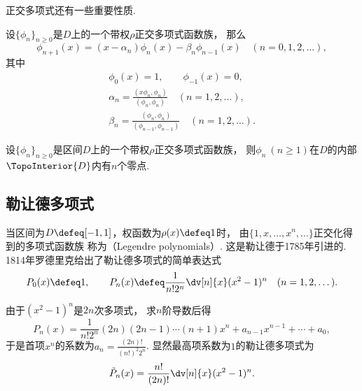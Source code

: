 正交多项式还有一些重要性质.
\begin{theorem}
设\(\{\phi_n\}_{n\geq0}\)是\(D\)上的一个带权\(\rho\)正交多项式函数族，
那么\begin{equation}
	\phi_{n+1}(x)
	= (x - \alpha_n) \phi_n(x)
	- \beta_n \phi_{n-1}(x)
	\quad(n=0,1,2,\dotsc),
\end{equation}
其中\begin{gather*}
	\phi_0(x) = 1,
	\qquad
	\phi_{-1}(x) = 0, \\
	\alpha_n
	= \frac{(x \phi_n,\phi_n)}{(\phi_n,\phi_n)}
	\quad(n=1,2,\dotsc), \\
	\beta_n
	= \frac{(\phi_n,\phi_n)}{(\phi_{n-1},\phi_{n-1})}
	\quad(n=1,2,\dotsc).
\end{gather*}
\end{theorem}

\begin{theorem}
设\(\{\phi_n\}_{n\geq0}\)是区间\(D\)上的一个带权\(\rho\)正交多项式函数族，
则\(\phi_n\ (n\geq1)\)在\(D\)的内部\(\TopoInterior{D}\)内有\(n\)个零点.
\end{theorem}

\subsection{勒让德多项式}
当区间为\(D \defeq [-1,1]\)，权函数为\(\rho(x) \defeq 1\)时，
由\(\{1,x,\dotsc,x^n,\dotsc\}\)正交化得到的多项式函数族
称为（Legendre polynomials）.
这是勒让德于1785年引进的.
1814年罗德里克给出了勒让德多项式的简单表达式\begin{equation}
	P_0(x) \defeq 1,
	\qquad
	P_n(x) \defeq \frac1{n!2^n} \dv[n]{x} (x^2-1)^n
	\quad(n=1,2,\dotsc).
\end{equation}

由于\((x^2-1)^n\)是\(2n\)次多项式，
求\(n\)阶导数后得\begin{equation*}
	P_n(x) = \frac1{n!2^n} (2n)(2n-1)\dotsm(n+1)x^n + a_{n-1} x^{n-1} + \dotsb + a_0,
\end{equation*}
于是首项\(x^n\)的系数为\(a_n = \frac{(2n)!}{(n!)^2 2^n}\).
显然最高项系数为\(1\)的勒让德多项式为\begin{equation*}
	\tilde{P}_n(x)
	= \frac{n!}{(2n)!} \dv[n]{x} (x^2-1)^n.
\end{equation*}


